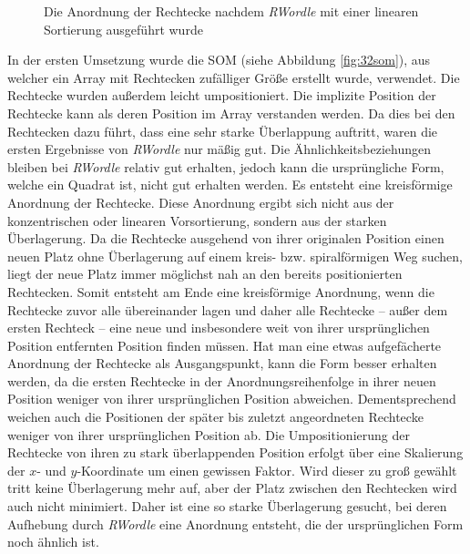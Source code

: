 \documentclass[12pt, ngerman, utf8]{article}
\begin{document}
\begin{figure}[h]
    \noindent
    \caption{Die Anordnung der Rechtecke nachdem \textit{RWordle} mit einer linearen Sortierung ausgeführt wurde}
    \label{fig:rwordle-lin}
\end{figure}
In der ersten Umsetzung wurde die SOM (siehe Abbildung \ref{fig:32som}), aus welcher ein Array mit Rechtecken zufälliger Größe erstellt wurde, verwendet. Die Rechtecke wurden außerdem leicht umpositioniert. Die implizite Position der Rechtecke kann als deren Position im Array verstanden werden. Da dies bei den Rechtecken dazu führt, dass eine sehr starke Überlappung auftritt, waren die ersten Ergebnisse von \emph{RWordle} nur mäßig gut. Die Ähnlichkeitsbeziehungen bleiben bei \emph{RWordle} relativ gut erhalten, jedoch kann die ursprüngliche Form, welche ein Quadrat ist, nicht gut erhalten werden. Es entsteht eine kreisförmige Anordnung der Rechtecke. Diese Anordnung ergibt sich nicht aus der konzentrischen oder linearen Vorsortierung, sondern aus der starken Überlagerung. Da die Rechtecke ausgehend von ihrer originalen Position einen neuen Platz ohne Überlagerung auf einem kreis- bzw. spiralförmigen Weg suchen, liegt der neue Platz immer möglichst nah an den bereits positionierten Rechtecken. Somit entsteht am Ende eine kreisförmige Anordnung, wenn die Rechtecke zuvor alle übereinander lagen und daher alle Rechtecke -- außer dem ersten Rechteck -- eine neue und insbesondere weit von ihrer ursprünglichen Position entfernten Position finden müssen. Hat man eine etwas aufgefächerte Anordnung der Rechtecke als Ausgangspunkt, kann die Form besser erhalten werden, da die ersten Rechtecke in der Anordnungsreihenfolge in ihrer neuen Position weniger von ihrer ursprünglichen Position abweichen. Dementsprechend weichen auch die Positionen der später bis zuletzt angeordneten Rechtecke weniger von ihrer ursprünglichen Position ab. Die Umpositionierung der Rechtecke von ihren zu stark überlappenden Position erfolgt über eine Skalierung der $x$- und $y$-Koordinate um einen gewissen Faktor. Wird dieser zu groß gewählt tritt keine Überlagerung mehr auf, aber der Platz zwischen den Rechtecken wird auch nicht minimiert. Daher ist eine so starke Überlagerung gesucht, bei deren Aufhebung durch \emph{RWordle} eine Anordnung entsteht, die der ursprünglichen Form noch ähnlich ist. 
\end{document}
